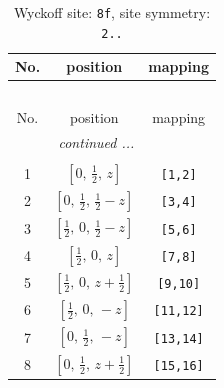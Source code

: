 \documentclass[fleqn,8pt]{jsarticle}
\begin{document}
\begin{longtable}{ccc}
\caption{Wyckoff site: {\tt 8f}, site symmetry: {\tt 2..}}
 \\
 \hline \hline
No. & position & mapping \\ \hline \endfirsthead

\multicolumn{2}{l}{\tablename\ \thetable{}} \\
 \hline \hline
No. & position & mapping \\ \hline \endhead

 \hline \hline
\multicolumn{2}{r}{\footnotesize\it continued ...} \\ \endfoot

 \hline \hline
\multicolumn{2}{r}{} \\ \endlastfoot

1 & $\left[ 0,\, \frac{1}{2},\, z \right]$ & {\tt [1,2]} \\ \hline
2 & $\left[ 0,\, \frac{1}{2},\, \frac{1}{2} - z \right]$ & {\tt [3,4]} \\ \hline
3 & $\left[ \frac{1}{2},\, 0,\, \frac{1}{2} - z \right]$ & {\tt [5,6]} \\ \hline
4 & $\left[ \frac{1}{2},\, 0,\, z \right]$ & {\tt [7,8]} \\ \hline
5 & $\left[ \frac{1}{2},\, 0,\, z + \frac{1}{2} \right]$ & {\tt [9,10]} \\ \hline
6 & $\left[ \frac{1}{2},\, 0,\, - z \right]$ & {\tt [11,12]} \\ \hline
7 & $\left[ 0,\, \frac{1}{2},\, - z \right]$ & {\tt [13,14]} \\ \hline
8 & $\left[ 0,\, \frac{1}{2},\, z + \frac{1}{2} \right]$ & {\tt [15,16]} \\
\end{longtable}
\renewcommand{\arraystretch}{1.2}
\end{document}
